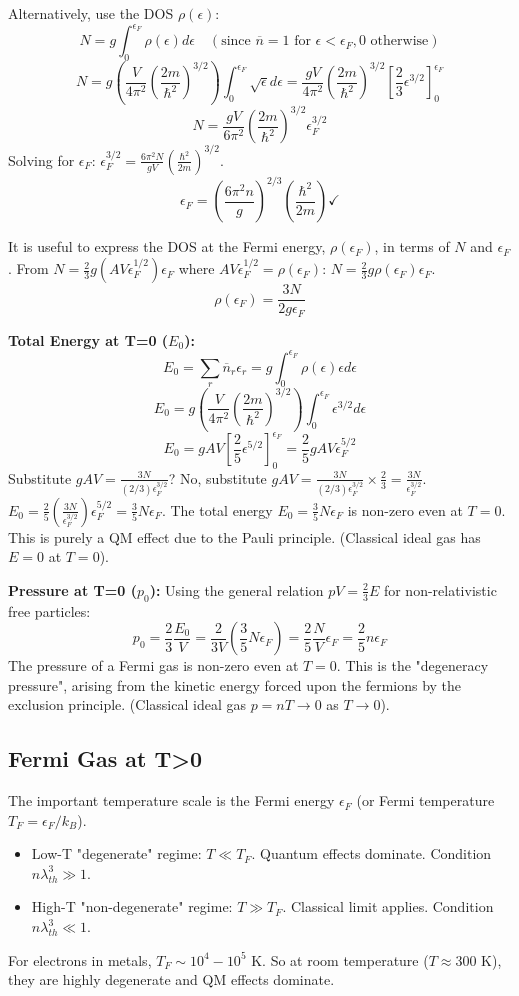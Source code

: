 \documentclass[11pt]{article}
\newcommand{\kb}{k_B} %
\newcommand{\lambdaT}{\lambda_{th}} %
\newcommand{\eps}{\epsilon}
\newcommand{\nbar}{\overline{n}} %
\newcommand{\ef}{\epsilon_F} %
\newcommand{\tf}{T_F} %
\begin{document}
Alternatively, use the DOS $\rho(\eps)$:
\[ N = g \int_0^{\ef} \rho(\eps) d\eps \quad (\text{since } \nbar=1 \text{ for } \eps < \ef, 0 \text{ otherwise}) \]
\[ N = g \left( \frac{V}{4\pi^2} \left(\frac{2m}{\hbar^2}\right)^{3/2} \right) \int_0^{\ef} \sqrt{\eps} d\eps = \frac{gV}{4\pi^2} \left(\frac{2m}{\hbar^2}\right)^{3/2} \left[ \frac{2}{3}\eps^{3/2} \right]_0^{\ef} \]
\[ N = \frac{gV}{6\pi^2} \left(\frac{2m}{\hbar^2}\right)^{3/2} \ef^{3/2} \]
Solving for $\ef$: $\ef^{3/2} = \frac{6\pi^2 N}{gV} \left(\frac{\hbar^2}{2m}\right)^{3/2}$.
\[ \ef = \left( \frac{6\pi^2 n}{g} \right)^{2/3} \left( \frac{\hbar^2}{2m} \right) \checkmark \]

It is useful to express the DOS at the Fermi energy, $\rho(\ef)$, in terms of $N$ and $\ef$.
From $N = \frac{2}{3} g (AV\ef^{1/2}) \ef$ where $AV\ef^{1/2} = \rho(\ef)$:
$N = \frac{2}{3} g \rho(\ef) \ef$.
\[ \rho(\ef) = \frac{3 N}{2 g \ef} \]

\textbf{Total Energy at T=0 ($E_0$):}
\[ E_0 = \sum_r \nbar_r \eps_r = g \int_0^{\ef} \rho(\eps) \eps d\eps \]
\[ E_0 = g \left( \frac{V}{4\pi^2} \left(\frac{2m}{\hbar^2}\right)^{3/2} \right) \int_0^{\ef} \eps^{3/2} d\eps \]
\[ E_0 = g A V \left[ \frac{2}{5}\eps^{5/2} \right]_0^{\ef} = \frac{2}{5} g A V \ef^{5/2} \]
Substitute $g A V = \frac{3N}{(2/3)\ef^{3/2}}$? No, substitute $gAV = \frac{3N}{(2/3)\ef^{3/2}} \times \frac{2}{3} = \frac{3N}{\ef^{3/2}}$.
$E_0 = \frac{2}{5} \left( \frac{3N}{\ef^{3/2}} \right) \ef^{5/2} = \frac{3}{5} N \ef$.
The total energy $E_0 = \frac{3}{5} N \ef$ is non-zero even at $T=0$. This is purely a QM effect due to the Pauli principle. (Classical ideal gas has $E=0$ at $T=0$).

\textbf{Pressure at T=0 ($p_0$):}
Using the general relation $pV = \frac{2}{3}E$ for non-relativistic free particles:
\[ p_0 = \frac{2}{3} \frac{E_0}{V} = \frac{2}{3V} \left( \frac{3}{5} N \ef \right) = \frac{2}{5} \frac{N}{V} \ef = \frac{2}{5} n \ef \]
The pressure of a Fermi gas is non-zero even at $T=0$. This is the "degeneracy pressure", arising from the kinetic energy forced upon the fermions by the exclusion principle. (Classical ideal gas $p=nT \to 0$ as $T \to 0$).

\subsection*{Fermi Gas at T>0}

The important temperature scale is the Fermi energy $\ef$ (or Fermi temperature $\tf = \ef / \kb$).
\begin{itemize}
    \item Low-T "degenerate" regime: $T \ll \tf$. Quantum effects dominate. Condition $n\lambdaT^3 \gg 1$.
    \item High-T "non-degenerate" regime: $T \gg \tf$. Classical limit applies. Condition $n\lambdaT^3 \ll 1$.
\end{itemize}
For electrons in metals, $\tf \sim 10^4 - 10^5$ K. So at room temperature ($T \approx 300$ K), they are highly degenerate and QM effects dominate.
\end{document}
